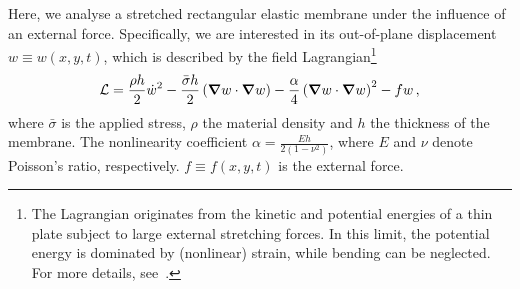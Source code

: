Here, we analyse a stretched rectangular elastic membrane under the influence of an external force. Specifically, we are interested in its out-of-plane displacement $w \equiv w(x,y,t)$, which is described by the field Lagrangian\footnote{The Lagrangian originates from the kinetic and potential energies of a thin plate subject to large external stretching forces. In this limit, the potential energy is dominated by (nonlinear) strain, while bending can be neglected. For more details, see~\cite{Landau_Lifshitz_7, Ugural}.}
\begin{equation}
\mathcal{L} = \frac{\rho h}{2} \dot{w}^2 - \frac{\bar{\sigma} h}{2} \left(\grad w \cdot \grad w\right) - \frac{\alpha}{4} \left(\grad w \cdot \grad w\right)^2 - f w\,,
\end{equation}
where $\bar{\sigma}$ is the applied stress, $\rho$ the material density and $h$ the thickness of the membrane. The nonlinearity coefficient $\alpha = \frac{E h}{2 (1 - \nu^2)}$, where $E$ and $\nu$ denote Poisson's ratio, respectively. $f \equiv f(x,y,t)$ is the external force.

